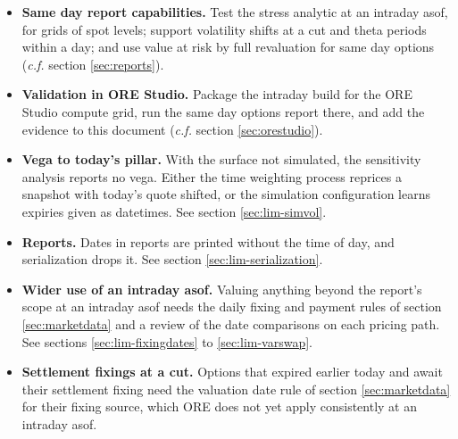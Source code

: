 \documentclass[12pt, a4paper]{article}
\begin{document}
\begin{itemize}
\item \textbf{Same day report capabilities.} Test the stress analytic at an intraday asof, for grids of spot levels;
  support volatility shifts at a cut and theta periods within a day; and use value at risk by full revaluation for
  same day options (\textit{c.f.} section \ref{sec:reports}).
\item \textbf{Validation in ORE Studio.} Package the intraday build for the ORE Studio compute grid, run the same day
  options report there, and add the evidence to this document (\textit{c.f.} section \ref{sec:orestudio}).
\item \textbf{Vega to today's pillar.} With the surface not simulated, the sensitivity analysis reports no vega. Either
  the time weighting process reprices a snapshot with today's quote shifted, or the simulation configuration learns expiries
  given as datetimes. See section \ref{sec:lim-simvol}.
\item \textbf{Reports.} Dates in reports are printed without the time of day, and serialization drops it. See section
  \ref{sec:lim-serialization}.
\item \textbf{Wider use of an intraday asof.} Valuing anything beyond the report's scope at an intraday asof needs the
  daily fixing and payment rules of section \ref{sec:marketdata} and a review of the date comparisons on each pricing
  path. See sections \ref{sec:lim-fixingdates} to \ref{sec:lim-varswap}.
\item \textbf{Settlement fixings at a cut.} Options that expired earlier today and await their settlement fixing
  need the valuation date rule of section \ref{sec:marketdata} for their fixing source, which ORE does not yet apply
  consistently at an intraday asof.
\end{itemize}
\end{document}
